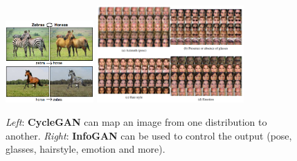 \begin{figure}
    \centering
    \includegraphics[width=0.3\textwidth]{images/gan/cyclegan.png}
    \includegraphics[width=0.5\textwidth]{images/gan/infogan.png}
    \caption{\textit{Left}: \textbf{CycleGAN} can map an image from one distribution to another. \textit{Right}: \textbf{InfoGAN} can be used to control the output (pose, glasses, hairstyle, emotion and more).}
    \label{fig:gan_conditional_generation}
\end{figure}

